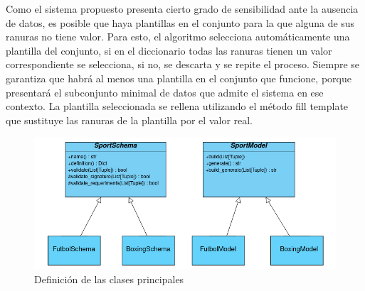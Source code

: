 Como el sistema propuesto presenta cierto grado de sensibilidad ante la ausencia de datos, es posible
que haya plantillas en el conjunto para la que alguna de sus ranuras no tiene valor. Para esto, el algoritmo
selecciona automáticamente una plantilla del conjunto, si en el diccionario todas las ranuras tienen un valor 
correspondiente se selecciona, si no, se descarta y se repite el proceso. Siempre se garantiza que habrá
al menos una plantilla en el conjunto que funcione, porque presentará el subconjunto minimal de datos que
admite el sistema en ese contexto. La plantilla seleccionada se rellena utilizando el  método fill template
que sustituye las ranuras de la plantilla por el valor real.




\begin{figure}[!]
    \begin{center}
        \includegraphics[width=\textwidth]{Graphics/classDef3.png}
    \end{center}
    \caption{Definición de las clases principales}
    \label{fig_classDef}
\end{figure}